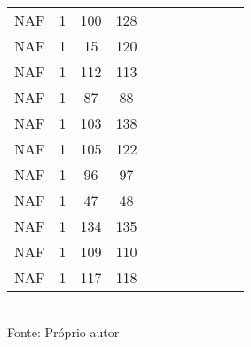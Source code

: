 \begin{table}[H]
{\begin{tabular}{ccccccccccc}
NAF & 1 & 100 & 128 &  &  &  &  &  &  &  \\
NAF & 1 & 15 & 120 &  &  &  &  &  &  &  \\
NAF & 1 & 112 & 113 &  &  &  &  &  &  &  \\
NAF & 1 & 87 & 88 &  &  &  &  &  &  &  \\
NAF & 1 & 103 & 138 &  &  &  &  &  &  &  \\
NAF & 1 & 105 & 122 &  &  &  &  &  &  &  \\
NAF & 1 & 96 & 97 &  &  &  &  &  &  &  \\
NAF & 1 & 47 & 48 &  &  &  &  &  &  &  \\
NAF & 1 & 134 & 135 &  &  &  &  &  &  &  \\
NAF & 1 & 109 & 110 &  &  &  &  &  &  &  \\
NAF & 1 & 117 & 118 &  &  &  &  &  &  &  \\
\bottomrule
\end{tabular}}
\\Fonte: Próprio autor
\end{table}


